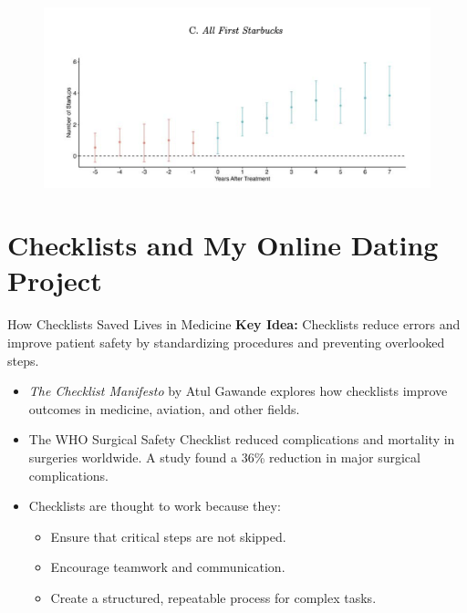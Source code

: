 \documentclass{beamer}
\begin{document}
\begin{frame}

\begin{figure}
    \centering
    \includegraphics[height=0.5\textheight]{./lecture_includes/magic_johnson_eventstudy}
\end{figure}

\end{frame}


\section{Checklists and My Online Dating Project}


\begin{frame}{How Checklists Saved Lives in Medicine}
    \textbf{Key Idea:} Checklists reduce errors and improve patient safety by standardizing procedures and preventing overlooked steps.

    \begin{itemize}
        \item 
	\textit{The Checklist Manifesto} by Atul Gawande explores how checklists improve outcomes in medicine, aviation, and other fields.
        \item 
	The WHO Surgical Safety Checklist reduced complications and mortality in surgeries worldwide. A study found a 36\% reduction in major surgical complications.
        \item 
	Checklists are thought to work because they:
        \begin{itemize}
            \item Ensure that critical steps are not skipped.
            \item Encourage teamwork and communication.
            \item Create a structured, repeatable process for complex tasks.
        \end{itemize}
    \end{itemize}


\end{frame}
\end{document}
